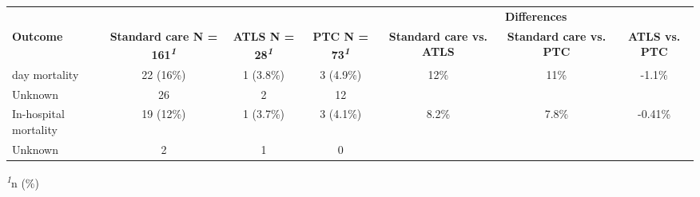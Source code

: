 \documentclass{article}
\begin{document}
\begingroup
\fontsize{12.0pt}{14.4pt}\selectfont
\setlength{\LTpost}{0mm}
\begin{longtable}{lcccccc}
\toprule
 &  &  &  & \multicolumn{3}{c}{\textbf{Differences}} \\ 
\cmidrule(lr){5-7}
\textbf{Outcome} & \textbf{Standard care N = 161\textsuperscript{\textit{1}}} & \textbf{ATLS N = 28\textsuperscript{\textit{1}}} & \textbf{PTC N = 73\textsuperscript{\textit{1}}} & \textbf{Standard care vs. ATLS} & \textbf{Standard care vs. PTC} & \textbf{ATLS vs. PTC} \\ 
\midrule\addlinespace[2.5pt]
30 day mortality & 22 (16\%) & 1 (3.8\%) & 3 (4.9\%) & 12\% & 11\% & -1.1\% \\ 
Unknown & 26 & 2 & 12 &  &  &  \\ 
In-hospital mortality & 19 (12\%) & 1 (3.7\%) & 3 (4.1\%) & 8.2\% & 7.8\% & -0.41\% \\ 
Unknown & 2 & 1 & 0 &  &  &  \\ 
\bottomrule
\end{longtable}
\begin{minipage}{\linewidth}
\textsuperscript{\textit{1}}n (\%)\\
\end{minipage}
\endgroup
\end{document}
